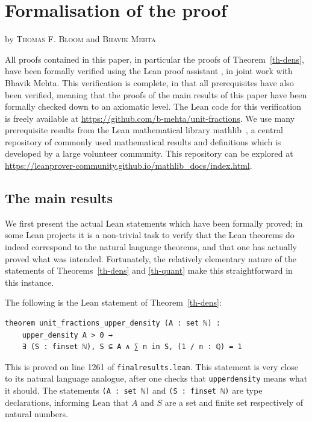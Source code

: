 \documentclass[12pt]{amsart}
\newcommand{\mathlib}{\textsf{mathlib}}
\begin{document}
\section{Formalisation of the proof}\label{app:form}
\smallskip
\begin{center}by \textsc{Thomas F. Bloom} and \textsc{Bhavik Mehta}\end{center}
\medskip

All proofs contained in this paper, in particular the proofs of Theorem~\ref{th-dens}, have been formally verified using the Lean proof assistant \cite{MouraLean}, in joint work with Bhavik Mehta. This verification is complete, in that all prerequisites have also been verified, meaning that the proofs of the main results of this paper have been formally checked down to an axiomatic level. The Lean code for this verification is freely available at \url{https://github.com/b-mehta/unit-fractions}. We use many prerequisite results from the Lean mathematical library \mathlib\ \cite{mathlib}, a central repository of commonly used mathematical results and definitions which is developed by a large volunteer community. This repository can be explored at \url{https://leanprover-community.github.io/mathlib_docs/index.html}.

\subsection{The main results}
We first present the actual Lean statements which have been formally proved; in some Lean projects it is a non-trivial task to verify that the Lean theorems do indeed correspond to the natural language theorems, and that one has actually proved what was intended. Fortunately, the relatively elementary nature of the statements of Theorems~\ref{th-dens} and \ref{th-quant} make this straightforward in this instance. 

The following is the Lean statement of Theorem~\ref{th-dens}:
\begin{lstlisting}
theorem unit_fractions_upper_density (A : set ℕ) : 
    upper_density A > 0 → 
    ∃ (S : finset ℕ), S ⊆ A ∧ ∑ n in S, (1 / n : ℚ) = 1
\end{lstlisting}
This is proved on line 1261 of \texttt{final\textunderscore results.lean}. This statement is very close to its natural language analogue, after one checks that \texttt{upper\textunderscore density} means what it should. The statements \lstinline{(A : set ℕ)} and \lstinline{(S : finset ℕ)} are type declarations, informing Lean that $A$ and $S$ are a set and finite set respectively of natural numbers. 
\end{document}
